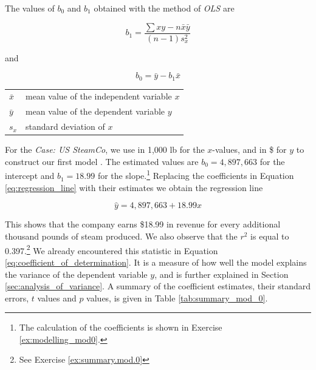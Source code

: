 \bigskip
The values of $b_0$ and $b_1$ obtained with the method of \emph{OLS} are

\begin{equation}
b_1 = \frac{\sum{xy} - n \bar{x} \bar{y}}{(n - 1) s^2_x}
\label{eq:slope_coefficient}
\end{equation}

\noindent and

\begin{equation}
b_0 = \bar{y} - b_1 \bar{x}
\label{eq:intercept_coefficient}
\end{equation}

\noindent

\begin{tabular}{ll}
$\bar{x}$ & mean value of the independent variable $x$ \\
$\bar{y}$ & mean value of the dependent variable $y$ \\
$s_x$     & standard deviation of $x$
\end{tabular}

For the \emph{Case: US SteamCo}, we use  in 1,000 lb for the $x$-values, and  in \$ for $y$ to construct our first model .
The estimated values are $b_0 = 4,897,663$ for the intercept and $b_1 = 18.99$ for the slope.\footnote{The calculation of the coefficients is shown in Exercise \ref{ex:modelling_mod0}.} Replacing the coefficients in Equation \ref{eq:regression_line} with their estimates we obtain the regression line

\begin{equation}
\hat{y} = 4,897,663 + 18.99 x
\label{eq:regression_model_0}
\end{equation}

This shows that the company earns \$18.99 in revenue for every additional thousand pounds of steam produced. We also observe that the  $r^2$ is equal to 0.397.\footnote{See Exercise \ref{ex:summary.mod.0}} We already encountered this statistic in Equation \ref{eq:coefficient_of_determination}. 
It is a measure of how well the model explains the variance of the dependent variable $y$, and is further explained in Section \ref{sec:analysis_of_variance}. 
A summary of the coefficient estimates, their standard errors, $t$ values and $p$ values, is given in Table \ref{tab:summary_mod_0}.

